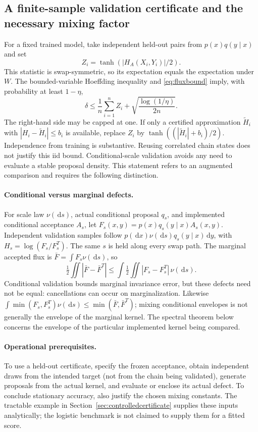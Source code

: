 \documentclass[pdflatex,iicol,sn-mathphys-ay]{sn-jnl}
\theoremstyle{definition}\newtheorem{definition}[theorem]{Definition}
\theoremstyle{remark}\newtheorem{remark}[theorem]{Remark}
\numberwithin{equation}{section}
\newcommand{\dd}{\,\mathrm d}\newcommand{\cA}{c_\alpha}\newcommand{\sg}{\operatorname{sigmoid}}
\newcommand{\1}{\mathbf 1}
\begin{document}
\subsection{A finite-sample validation certificate and the necessary mixing factor}
For a fixed trained model, take independent held-out pairs from $p(x)q(y\mid x)$ and set
\[
Z_i=\tanh(|H_A(X_i,Y_i)|/2).
\]
This statistic is swap-symmetric, so its expectation equals the expectation under $W$. The bounded-variable Hoeffding inequality \citep{hoeffding} and \eqref{eq:fluxbound} imply, with probability at least $1-\eta$,
\begin{equation}
\delta\le\frac1n\sum_{i=1}^n Z_i+
\sqrt{\frac{\log(1/\eta)}{2n}}.\label{eq:validation}
\end{equation}
The right-hand side may be capped at one. If only a certified approximation $\widetilde H_i$ with $|H_i-\widetilde H_i|\le b_i$ is available, replace $Z_i$ by $\tanh((|\widetilde H_i|+b_i)/2)$. Independence from training is substantive. Reusing correlated chain states does not justify this iid bound. Conditional-scale validation avoids any need to evaluate a stable proposal density. This statement refers to an augmented comparison and requires the following distinction.

\paragraph{Conditional versus marginal defects.}
For scale law $\nu(\dd s)$, actual conditional proposal $q_s$, and implemented conditional acceptance $A_s$, let $F_s(x,y)=p(x)q_s(y\mid x)A_s(x,y)$. Independent validation samples follow $p(\dd x)\nu(\dd s)q_s(y\mid x)\dd y$, with $H_s=\log(F_s/F_s^T)$. The same $s$ is held along every swap path. The marginal accepted flux is $\bar F=\int F_s\nu(\dd s)$, so
\[
 \tfrac12\iint|\bar F-\bar F^T|
 \le\int\tfrac12\iint|F_s-F_s^T|\,\nu(\dd s).
\]
Conditional validation bounds marginal invariance error, but these defects need not be equal: cancellations can occur on marginalization. Likewise $\int\min(F_s,F_s^T)\nu(\dd s)\le\min(\bar F,\bar F^T)$; mixing conditional envelopes is not generally the envelope of the marginal kernel. The spectral theorem below concerns the envelope of the particular implemented kernel being compared.

\paragraph{Operational prerequisites.}
To use a held-out certificate, specify the frozen acceptance, obtain independent draws from the intended target (not from the chain being validated), generate proposals from the actual kernel, and evaluate or enclose its actual defect. To conclude stationary accuracy, also justify the chosen mixing constants. The tractable example in Section~\ref{sec:controlledcertificate} supplies these inputs analytically; the logistic benchmark is not claimed to supply them for a fitted score.
\end{document}
